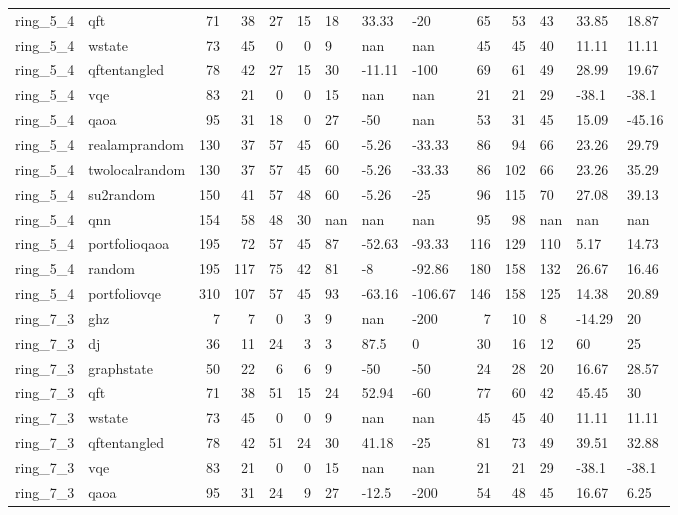 \begin{longtable}{llrrrrlllrrlll}
ring\_5\_4 & qft & 71 & 38 & 27 & 15 & 18 & 33.33 & -20 & 65 & 53 & 43 & 33.85 & 18.87 \\
ring\_5\_4 & wstate & 73 & 45 & 0 & 0 & 9 & nan & nan & 45 & 45 & 40 & 11.11 & 11.11 \\
ring\_5\_4 & qftentangled & 78 & 42 & 27 & 15 & 30 & -11.11 & -100 & 69 & 61 & 49 & 28.99 & 19.67 \\
ring\_5\_4 & vqe & 83 & 21 & 0 & 0 & 15 & nan & nan & 21 & 21 & 29 & -38.1 & -38.1 \\
ring\_5\_4 & qaoa & 95 & 31 & 18 & 0 & 27 & -50 & nan & 53 & 31 & 45 & 15.09 & -45.16 \\
ring\_5\_4 & realamprandom & 130 & 37 & 57 & 45 & 60 & -5.26 & -33.33 & 86 & 94 & 66 & 23.26 & 29.79 \\
ring\_5\_4 & twolocalrandom & 130 & 37 & 57 & 45 & 60 & -5.26 & -33.33 & 86 & 102 & 66 & 23.26 & 35.29 \\
ring\_5\_4 & su2random & 150 & 41 & 57 & 48 & 60 & -5.26 & -25 & 96 & 115 & 70 & 27.08 & 39.13 \\
ring\_5\_4 & qnn & 154 & 58 & 48 & 30 & nan & nan & nan & 95 & 98 & nan & nan & nan \\
ring\_5\_4 & portfolioqaoa & 195 & 72 & 57 & 45 & 87 & -52.63 & -93.33 & 116 & 129 & 110 & 5.17 & 14.73 \\
ring\_5\_4 & random & 195 & 117 & 75 & 42 & 81 & -8 & -92.86 & 180 & 158 & 132 & 26.67 & 16.46 \\
ring\_5\_4 & portfoliovqe & 310 & 107 & 57 & 45 & 93 & -63.16 & -106.67 & 146 & 158 & 125 & 14.38 & 20.89 \\
ring\_7\_3 & ghz & 7 & 7 & 0 & 3 & 9 & nan & -200 & 7 & 10 & 8 & -14.29 & 20 \\
ring\_7\_3 & dj & 36 & 11 & 24 & 3 & 3 & 87.5 & 0 & 30 & 16 & 12 & 60 & 25 \\
ring\_7\_3 & graphstate & 50 & 22 & 6 & 6 & 9 & -50 & -50 & 24 & 28 & 20 & 16.67 & 28.57 \\
ring\_7\_3 & qft & 71 & 38 & 51 & 15 & 24 & 52.94 & -60 & 77 & 60 & 42 & 45.45 & 30 \\
ring\_7\_3 & wstate & 73 & 45 & 0 & 0 & 9 & nan & nan & 45 & 45 & 40 & 11.11 & 11.11 \\
ring\_7\_3 & qftentangled & 78 & 42 & 51 & 24 & 30 & 41.18 & -25 & 81 & 73 & 49 & 39.51 & 32.88 \\
ring\_7\_3 & vqe & 83 & 21 & 0 & 0 & 15 & nan & nan & 21 & 21 & 29 & -38.1 & -38.1 \\
ring\_7\_3 & qaoa & 95 & 31 & 24 & 9 & 27 & -12.5 & -200 & 54 & 48 & 45 & 16.67 & 6.25 \\

\end{longtable}
